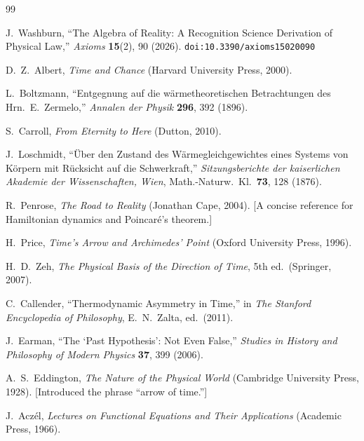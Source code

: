 \documentclass[12pt,a4paper]{article}
\theoremstyle{definition}
\theoremstyle{remark}
\begin{document}
\begin{thebibliography}{99}

J.~Washburn, ``The Algebra of Reality: A Recognition Science Derivation
of Physical Law,'' \emph{Axioms} \textbf{15}(2), 90 (2026).
\texttt{doi:10.3390/axioms15020090}

D.~Z.~Albert, \emph{Time and Chance} (Harvard University Press, 2000).

L.~Boltzmann, ``Entgegnung auf die w\"armetheoretischen Betrachtungen
des Hrn.\ E.~Zermelo,'' \emph{Annalen der Physik} \textbf{296}, 392
(1896).

S.~Carroll, \emph{From Eternity to Here} (Dutton, 2010).

J.~Loschmidt, ``\"Uber den Zustand des W\"armegleichgewichtes eines
Systems von K\"orpern mit R\"ucksicht auf die Schwerkraft,''
\emph{Sitzungsberichte der kaiserlichen Akademie der Wissenschaften,
Wien}, Math.-Naturw.\ Kl.\ \textbf{73}, 128 (1876).

R.~Penrose, \emph{The Road to Reality} (Jonathan Cape, 2004).
[A concise reference for Hamiltonian dynamics and Poincar\'e's theorem.]

H.~Price, \emph{Time's Arrow and Archimedes' Point} (Oxford University
Press, 1996).

H.~D.~Zeh, \emph{The Physical Basis of the Direction of Time}, 5th
ed.\ (Springer, 2007).

C.~Callender, ``Thermodynamic Asymmetry in Time,'' in \emph{The Stanford
Encyclopedia of Philosophy}, E.~N.~Zalta, ed.\ (2011).

J.~Earman, ``The `Past Hypothesis': Not Even False,'' \emph{Studies in
History and Philosophy of Modern Physics} \textbf{37}, 399 (2006).

A.~S.~Eddington, \emph{The Nature of the Physical World}
(Cambridge University Press, 1928).
[Introduced the phrase ``arrow of time.'']

J.~Acz\'el, \emph{Lectures on Functional Equations and Their
Applications} (Academic Press, 1966).

\end{thebibliography}
\end{document}
